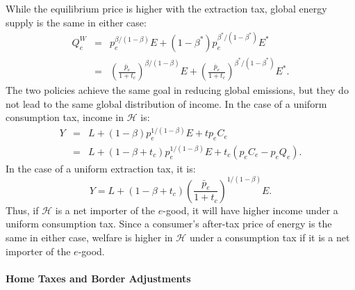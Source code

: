 \documentclass[notitlepage,12pt]{article}
\begin{document}
While the equilibrium price is higher with the extraction tax, global energy
supply is the same in either case:%
\begin{eqnarray*}
Q_{e}^{W} &=&p_{e}^{\beta /(1-\beta )}E+\left( 1-\beta ^{\ast }\right)
p_{e}^{\beta ^{\ast }/(1-\beta ^{\ast })}E^{\ast } \\
&=&\left( \frac{\bar{p}_{e}}{1+t_{c}}\right) ^{\beta /(1-\beta )}E+\left( 
\frac{\bar{p}_{e}}{1+t_{c}}\right) ^{\beta ^{\ast }/(1-\beta ^{\ast
})}E^{\ast }.
\end{eqnarray*}%
The two policies achieve the same goal in reducing global emissions, but
they do not lead to the same global distribution of income. In the case of a
uniform consumption tax, income in $\mathcal{H}$ is:%
\begin{eqnarray*}
Y &=&L+\left( 1-\beta \right) p_{e}^{1/(1-\beta )}E+tp_{e}C_{e} \\
&=&L+\left( 1-\beta +t_{c}\right) p_{e}^{1/(1-\beta )}E+t_{c}\left(
p_{e}C_{e}-p_{e}Q_{e}\right) .
\end{eqnarray*}%
In the case of a uniform extraction tax, it is:%
\begin{equation*}
Y=L+\left( 1-\beta +t_{c}\right) \left( \frac{\bar{p}_{e}}{1+t_{c}}\right)
^{1/(1-\beta )}E.
\end{equation*}%
Thus, if $\mathcal{H}$ is a net importer of the $e$-good, it will have
higher income under a uniform consumption tax. Since a consumer's after-tax
price of energy is the same in either case, welfare is higher in $\mathcal{H}
$ under a consumption tax if it is a net importer of the $e$-good.

\paragraph{Home Taxes and Border Adjustments}
\end{document}
